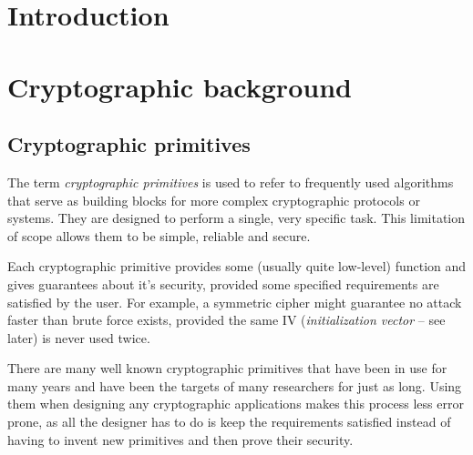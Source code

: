 \chapter{Introduction}



\chapter{Cryptographic background}


\section{Cryptographic primitives}

The term \emph{cryptographic primitives} is used to refer to frequently used algorithms that serve as building blocks for more complex cryptographic protocols or systems.
They are designed to perform a single, very specific task.
This limitation of scope allows them to be simple, reliable and secure.

Each cryptographic primitive provides some (usually quite low-level) function and gives guarantees about it's security, provided some specified requirements are satisfied by the user. 
For example, a symmetric cipher might guarantee no attack faster than brute force exists, provided the same IV (\emph{initialization vector} -- see later) is never used twice.

There are many well known cryptographic primitives that have been in use for many years and have been the targets of many researchers for just as long.
Using them when designing any cryptographic applications makes this process less error prone, as all the designer has to do is keep the requirements satisfied instead of having to invent new primitives and then prove their security.

